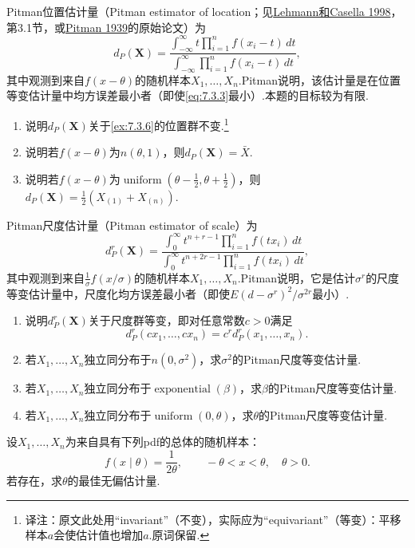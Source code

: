 \begin{exercise}\label{exercise:7.35}
Pitman位置估计量（Pitman estimator of location；见\hyperref[bib:source200]{Lehmann和Casella 1998}，第3.1节，或\hyperref[bib:source242]{Pitman 1939}的原始论文）为
$$d_P(\boldsymbol X)=\frac{\int_{-\infty}^\infty t\prod_{i=1}^nf(x_i-t)\,dt}{\int_{-\infty}^\infty\prod_{i=1}^nf(x_i-t)\,dt},$$
其中观测到来自$f(x-\theta)$的随机样本$X_1,\ldots,X_n$.Pitman说明，该估计量是在位置等变估计量中均方误差最小者（即使\eqref{eq:7.3.3}最小）.本题的目标较为有限.
\begin{enumerate}[label=(\alph*)]
\item 说明$d_P(\boldsymbol X)$关于\autoref{ex:7.3.6}的位置群不变.\footnote{译注：原文此处用“invariant”（不变），实际应为“equivariant”（等变）：平移样本$a$会使估计值也增加$a$.原词保留.}
\item 说明若$f(x-\theta)$为$n(\theta,1)$，则$d_P(\boldsymbol X)=\bar X$.
\item 说明若$f(x-\theta)$为$\operatorname{uniform}(\theta-\frac12,\theta+\frac12)$，则$d_P(\boldsymbol X)=\frac12(X_{(1)}+X_{(n)})$.
\end{enumerate}
\end{exercise}
\begin{exercise}\label{exercise:7.36}
Pitman尺度估计量（Pitman estimator of scale）为
$$d_P^r(\boldsymbol X)=\frac{\int_0^\infty t^{n+r-1}\prod_{i=1}^nf(tx_i)\,dt}{\int_0^\infty t^{n+2r-1}\prod_{i=1}^nf(tx_i)\,dt},$$
其中观测到来自$\frac1\sigma f(x/\sigma)$的随机样本$X_1,\ldots,X_n$.Pitman说明，它是估计$\sigma^r$的尺度等变估计量中，尺度化均方误差最小者（即使$E(d-\sigma^r)^2/\sigma^{2r}$最小）.
\begin{enumerate}[label=(\alph*)]
\item 说明$d_P^r(\boldsymbol X)$关于尺度群等变，即对任意常数$c>0$满足
$$d_P^r(cx_1,\ldots,cx_n)=c^rd_P^r(x_1,\ldots,x_n).$$
\item 若$X_1,\ldots,X_n$独立同分布于$n(0,\sigma^2)$，求$\sigma^2$的Pitman尺度等变估计量.
\item 若$X_1,\ldots,X_n$独立同分布于$\operatorname{exponential}(\beta)$，求$\beta$的Pitman尺度等变估计量.
\item 若$X_1,\ldots,X_n$独立同分布于$\operatorname{uniform}(0,\theta)$，求$\theta$的Pitman尺度等变估计量.
\end{enumerate}
\end{exercise}
\begin{exercise}\label{exercise:7.37}
设$X_1,\ldots,X_n$为来自具有下列pdf的总体的随机样本：
$$f(x\mid\theta)=\frac1{2\theta},\qquad-\theta<x<\theta,\quad\theta>0.$$
若存在，求$\theta$的最佳无偏估计量.
\end{exercise}
